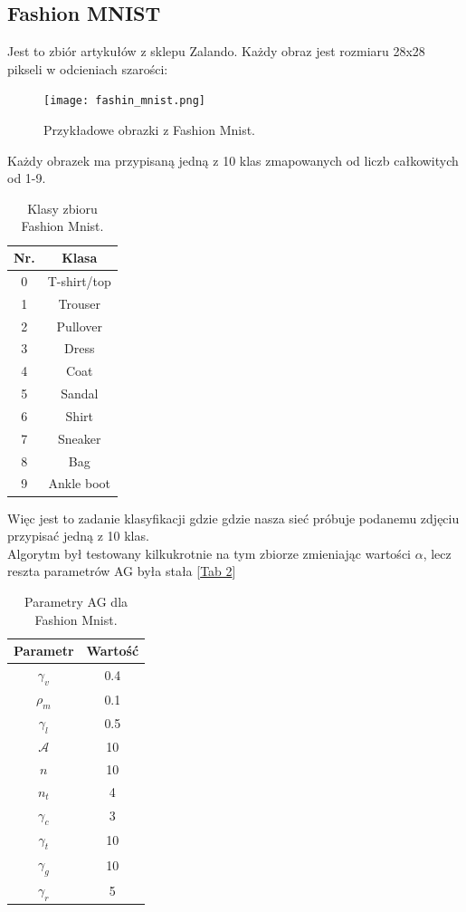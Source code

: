 \documentclass{article}
\begin{document}
\subsection{Fashion MNIST}
Jest to zbiór artykułów z sklepu Zalando. Każdy obraz jest rozmiaru 28x28 pikseli w odcieniach 
szarości:

\begin{figure}[H]
\centering
\texttt{[image: fashin\_mnist.png]}
\caption{Przykładowe obrazki z Fashion Mnist.}
\end{figure}
Każdy obrazek ma przypisaną jedną z 10 klas zmapowanych od liczb całkowitych od 1-9.
\begin{table}[H]
\centering
\begin{tabular}{|c|c|}
	\hline
	Nr. & Klasa \\
	\hline
	0 & T-shirt/top \\
	1 & Trouser \\
	2 & Pullover \\
	3 & Dress \\
	4 & Coat \\
	5 & Sandal \\
	6 & Shirt \\
	7 & Sneaker \\
	8 & Bag \\
	9 & Ankle boot \\
	\hline
\end{tabular}
\caption{\label{tab:fmcls}Klasy zbioru Fashion Mnist.}
\end{table}
Więc jest to zadanie klasyfikacji gdzie gdzie nasza sieć próbuje podanemu zdjęciu przypisać jedną
z 10 klas.\\
Algorytm był testowany kilkukrotnie na tym zbiorze zmieniając wartości $\alpha$, lecz reszta
parametrów AG była stała [\hyperref[tab:params]{Tab 2}]\\
\begin{table}[H]
\centering
\begin{tabular}{|c|c|}
	\hline
	Parametr & Wartość\\
	\hline
	 $\gamma_v$ &0.4\\
	 $\rho_m$ &0.1\\
	 $\gamma_l$& 0.5\\
	 $\mathcal{A}$ &10\\
	 $n$  &10\\
	 $n_t$  &4\\
	 $\gamma_c$  &3\\
	 $\gamma_t$ &10\\
	 $\gamma_g$ &10\\
	 $\gamma_r$ &5\\
	\hline
\end{tabular}
\caption{\label{tab:fm_params}Parametry AG dla Fashion Mnist.}
\end{table}
\end{document}
